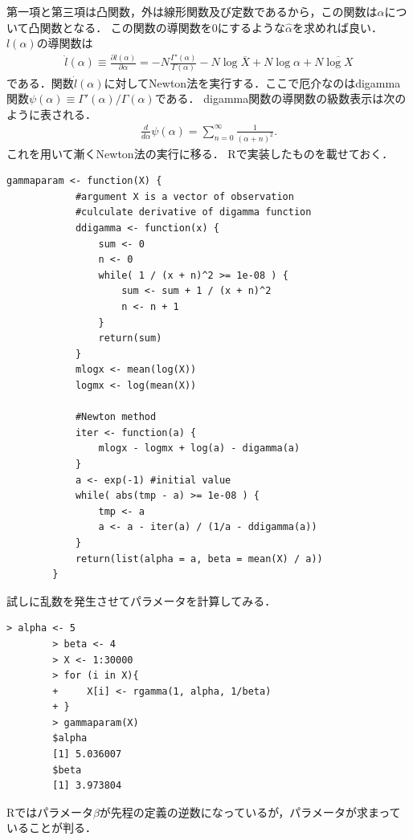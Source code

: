 \documentclass[a4j,papersize,disablejfam,slide,14pt]{jsarticle}
\def\Log#1{\operatorname{log} #1} %
\begin{document}
    第一項と第三項は凸関数，外は線形関数及び定数であるから，この関数は$\alpha$について凸関数となる．
    この関数の導関数を$0$にするような$\hat{\alpha}$を求めれば良い．$l(\alpha)$の導関数は
    \begin{align}
    	\dot{l}(\alpha) \equiv \frac{\partial l(\alpha)}{\partial \alpha} 
        = -N \frac{\Gamma'(\alpha)}{\Gamma(\alpha)} - N \Log{\overline{X}} + N \Log{\alpha} + N \overline{\Log{X}}
    \end{align}
    である．関数$\dot{l}(\alpha)$に対して{\rm Newton}法を実行する．ここで厄介なのは{\rm digamma}関数$\psi(\alpha) \equiv \Gamma'(\alpha)/\Gamma(\alpha)$である．
    {\rm digamma}関数の導関数の級数表示は次のように表される．
    \begin{align}
    	\frac{d}{d \alpha} \psi(\alpha) = \sum_{n=0}^{\infty} \frac{1}{(\alpha + n)^2}.
    \end{align}
    これを用いて漸く{\rm Newton}法の実行に移る．
    {\rm R}で実装したものを載せておく．
    \begin{lstlisting}[style=customR]
    	gammaparam <- function(X) {
        	#argument X is a vector of observation
        	#culculate derivative of digamma function
            ddigamma <- function(x) {
            	sum <- 0
                n <- 0
                while( 1 / (x + n)^2 >= 1e-08 ) {
                	sum <- sum + 1 / (x + n)^2
                    n <- n + 1
                }
                return(sum)
            }
            mlogx <- mean(log(X))
            logmx <- log(mean(X))
            
            #Newton method
            iter <- function(a) {
            	mlogx - logmx + log(a) - digamma(a)
            }
            a <- exp(-1) #initial value
            while( abs(tmp - a) >= 1e-08 ) {
            	tmp <- a
            	a <- a - iter(a) / (1/a - ddigamma(a))
            }
            return(list(alpha = a, beta = mean(X) / a)) 
        }
    \end{lstlisting}
    試しに乱数を発生させてパラメータを計算してみる．
    \begin{lstlisting}[style=customR]
    	> alpha <- 5
		> beta <- 4
		> X <- 1:30000
		> for (i in X){
		+     X[i] <- rgamma(1, alpha, 1/beta)
		+ }
		> gammaparam(X)
		$alpha
		[1] 5.036007
        $beta
        [1] 3.973804
	\end{lstlisting}
    {\rm R}ではパラメータ$\beta$が先程の定義の逆数になっているが，パラメータが求まっていることが判る．
\end{document}
